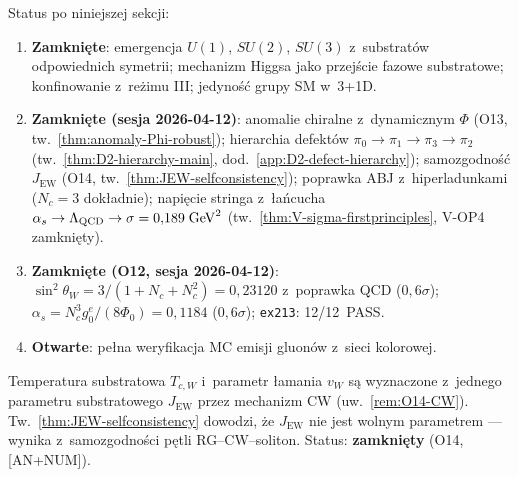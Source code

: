 \begin{problem}\label{prob:cechowanie}
Status po niniejszej sekcji:
\begin{enumerate}[nosep]
    \item \textbf{Zamknięte}: emergencja $U(1)$, $SU(2)$,
          $SU(3)$ z~substratów odpowiednich symetrii;
          mechanizm Higgsa jako przejście fazowe substratowe;
          konfinowanie z~reżimu III; jedyność grupy SM w~3+1D.
    \item \textbf{Zamkni\k{e}te (sesja 2026-04-12)}:
          anomalie chiralne z~dynamicznym $\Phi$
          (O13, tw.~\ref{thm:anomaly-Phi-robust});
          hierarchia defekt\'ow $\pi_0 \to \pi_1 \to \pi_3 \to \pi_2$
          (tw.~\ref{thm:D2-hierarchy-main}, dod.~\ref{app:D2-defect-hierarchy});
          samozgodno\'s\'c $J_{\mathrm{EW}}$
          (O14, tw.~\ref{thm:JEW-selfconsistency});
          poprawka ABJ z~hiperladunkami ($N_c = 3$ dok\l{}adnie);
          napi\k{e}cie stringa z~\l{}a\'ncucha
          $\alpha_s \to \Lambda_{\rm QCD} \to \sigma = 0{,}189\;\mathrm{GeV}^2$
          (tw.~\ref{thm:V-sigma-firstprinciples}, V-OP4 zamkni\k{e}ty).
    \item \textbf{Zamkni\k{e}te (O12, sesja 2026-04-12)}:
          $\sin^2\theta_W = 3/(1{+}N_c{+}N_c^2) = 0{,}23120$ z~poprawka QCD ($0{,}6\sigma$);
          $\alpha_s = N_c^3 g_0^e/(8\Phi_0) = 0{,}1184$ ($0{,}6\sigma$);
          \texttt{ex213}: 12/12~PASS\@.
    \item \textbf{Otwarte}: pe\l{}na weryfikacja
          MC emisji gluon\'ow z~sieci kolorowej.
\end{enumerate}
\end{problem}

\begin{problem}\label{prob:EW-breaking}
Temperatura substratowa $T_{c,W}$ i~parametr \l{}amania $v_W$
s\k{a} wyznaczone z~jednego parametru substratowego $J_{\mathrm{EW}}$
przez mechanizm CW (uw.~\ref{rem:O14-CW}). Tw.~\ref{thm:JEW-selfconsistency}
dowodzi, \.ze $J_{\mathrm{EW}}$ nie jest wolnym parametrem ---
wynika z~samozgodno\'sci p\k{e}tli RG--CW--soliton.
Status: \textbf{zamkni\k{e}ty} (O14, [AN+NUM]).
\end{problem}

